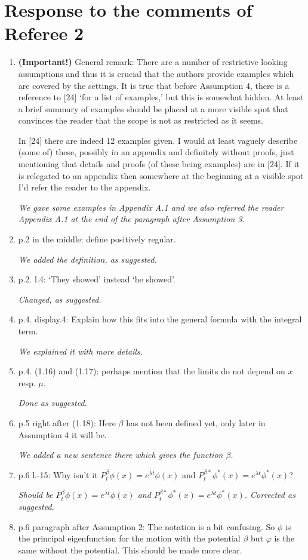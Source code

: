 \documentclass[12pt,a4paper]{amsart}
\numberwithin{equation}{section}
\theoremstyle{plain}
\theoremstyle{definition}
\begin{document}
\section*{Response to the comments of Referee 2}
\begin{enumerate}
\item
  {\bf (Important!)} General remark: There are a number of restrictive looking assumptions and thus it is crucial that the authors provide examples which are covered by the settings.
  It is true that before Assumption 4, there is a reference to [24] `for a list of examples,' but this is somewhat hidden.
  At least a brief summary of examples should be placed at a more visible spot that convinces the reader that the scope is not as restricted as it seems.

  In [24] there are indeed 12 examples given.
  I would at least vaguely describe (some of) these, possibly in an appendix and definitely without proofs, just mentioning that details and proofs (of these being examples) are in [24].
  If it is relegated to an appendix then somewhere at the beginning at a visible spot I'd refer the reader to the appendix.

  {\it We gave some examples in Appendix A.1 and we also referred the reader Appendix A.1 at the end of the paragraph  after Assumption 3.}
\item
  p.2 in the middle: define positively regular.

  {\it We added the definition, as suggested.}
\item
  p.2. l.4: `They showed' instead `he showed'.

  {\it Changed, as suggested.}
\item
  p.4. display.4: Explain how this fits into the general formula with the integral term.

  {\it We explained it with more details.}
\item
  p.4. (1.16) and (1.17): perhaps mention that the limits do not depend on $x$ resp. $\mu$.

  {\it Done as suggested.}
\item
  p.5 right after (1.18): Here $\beta$ has not been defined yet, only later in Assumption 4 it will be.

  {\it We added a new sentence there which gives the function $\beta$.}
\item
  p.6 l.-15: Why isn't it $P_t^\beta \phi(x) = e^{\lambda t}\phi(x)$ and $P_t^{\beta*} \phi^*(x) = e^{\lambda t}\phi^*(x)$?

  {\it Should be $P_t^\beta \phi(x) = e^{\lambda t}\phi(x)$ and $P_t^{\beta*} \phi^*(x) = e^{\lambda t}\phi^*(x)$. Corrected as suggested.}
\item
  p.6 paragraph after Assumption 2: The notation is a bit confusing. So $\phi$ is the principal eigenfunction for the motion with the potential $\beta$ but $\varphi$ is the same without the potential.
  This should be made more clear.


\end{enumerate}
\end{document}
